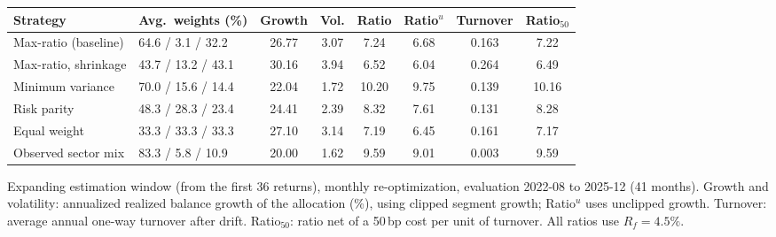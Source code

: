 \begin{tabular}{llcccccc}
\toprule
\textbf{Strategy} & Avg.\ weights (\%) & Growth & Vol. & Ratio & Ratio$^{u}$ & Turnover & Ratio$_{50}$ \\
\midrule
Max-ratio (baseline) & 64.6 / 3.1 / 32.2 & 26.77 & 3.07 & 7.24 & 6.68 & 0.163 & 7.22 \\
Max-ratio, shrinkage & 43.7 / 13.2 / 43.1 & 30.16 & 3.94 & 6.52 & 6.04 & 0.264 & 6.49 \\
Minimum variance & 70.0 / 15.6 / 14.4 & 22.04 & 1.72 & 10.20 & 9.75 & 0.139 & 10.16 \\
Risk parity & 48.3 / 28.3 / 23.4 & 24.41 & 2.39 & 8.32 & 7.61 & 0.131 & 8.28 \\
Equal weight & 33.3 / 33.3 / 33.3 & 27.10 & 3.14 & 7.19 & 6.45 & 0.161 & 7.17 \\
Observed sector mix & 83.3 / 5.8 / 10.9 & 20.00 & 1.62 & 9.59 & 9.01 & 0.003 & 9.59 \\
\bottomrule
\end{tabular}
\par\smallskip\parbox{\linewidth}{\footnotesize Expanding estimation window (from the first 36 returns), monthly re-optimization, evaluation 2022-08 to 2025-12 (41 months). Growth and volatility: annualized realized balance growth of the allocation (\%), using clipped segment growth; Ratio$^{u}$ uses unclipped growth. Turnover: average annual one-way turnover after drift. Ratio$_{50}$: ratio net of a 50\,bp cost per unit of turnover. All ratios use $R_f = 4.5\%$.}
